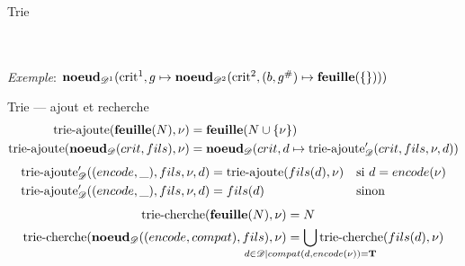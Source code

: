 \documentclass[serif]{beamer}
\newcommand{\exemple}{\textit{Exemple}\xspace}
\newcommand{\N}{\mathrm{N}}
\newcommand{\mathhyphen}{{\hbox{-}}}
\begin{document}

\begin{frame}{Trie}
\small
{}
\\~\\
\exemple : $\bold{noeud}_{\mathscr{D}^1} (\mathrm{crit}^1, g \mapsto \bold{noeud}_{\mathscr{D}^2} (\mathrm{crit}^2, (b, g^\#) \mapsto \bold{feuille} (\{ \})))$
\end{frame}


\begin{frame}{Trie — ajout et recherche}
\scriptsize
\begin{align*}
		\mathrm{trie\mathhyphen ajoute} (\bold{feuille} (N), \nu) &=
		\bold{feuille} (N \cup \{ \nu \})
	\\
		\mathrm{trie\mathhyphen ajoute} (\bold{noeud}_\mathscr{D} (crit, fils), \nu) &=
		\bold{noeud}_\mathscr{D} (crit, d \mapsto \mathrm{trie\mathhyphen ajoute}_\mathscr{D}' (crit, fils, \nu, d))
\end{align*}
\begin{align*}
		\mathrm{trie\mathhyphen ajoute}_\mathscr{D}' ((encode, \_), fils, \nu, d) &=
		\mathrm{trie\mathhyphen ajoute} (fils (d), \nu) &&
		\text{si } d = encode (\nu)
	\\
		\mathrm{trie\mathhyphen ajoute}_\mathscr{D}' ((encode, \_), fils, \nu, d) &=
		fils (d) &&
		\text{sinon}
\end{align*}
\begin{align*}
		\mathrm{trie\mathhyphen cherche} (\bold{feuille} (N), \nu) &=
		N
	\\
		\mathrm{trie\mathhyphen cherche} (\bold{noeud}_\mathscr{D} ((encode, compat), fils), \nu) &=
		\bigcup_{\mathclap{{d \in \mathscr{D} \mid compat (d, encode (\nu)) = \bold{T}}}} \mathrm{trie\mathhyphen cherche} (fils (d), \nu)
\end{align*}
\end{frame}

\end{document}

